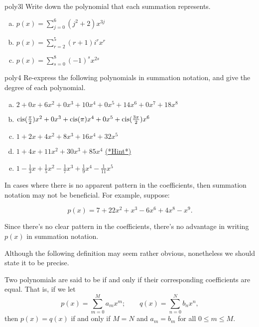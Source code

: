 \begin{exercise}{poly3l}
Write down the polynomial that each summation represents.
\begin{enumerate}[(a)]
\item
$p(x)  = \sum_{j=0}^{6}( j^2+2)x^{3j}$
\item
$p(x)  = \sum_{r=2}^{5} (r+1)i^rx^r$
\item
$p(x)  = \sum_{s=0}^{8} (-1)^sx^{2s}$
\end{enumerate}
\end{exercise}

\begin{exercise}{poly4}
Re-express the following polynomials in summation notation,  and give the degree of each polynomial.
\begin{enumerate}[(a)]
\item
$2 + 0x + 6x^2 + 0x^3 + 10x^4 + 0x^5 + 14x^6 +0x^7 +  18x^8$
\item
$\operatorname{cis}(\frac{\pi}{2})x^2 + 0x^3 + \operatorname{cis}(\pi)x^4 + 0x^5  + \operatorname{cis}(\frac{3\pi}{2})x^6$
\item
$1+ 2x + 4x^2 + 8x^3 + 16x^4 + 32x^5$
\item
$1+4x+11x^2+30x^3+85x^4$
\hyperref[sec:polyrings:hints]{(*Hint*)} 
\item
$1-\frac{1}{3}x + \frac{1}{5}x^2 - \frac{1}{7}x^3 + \frac{1}{9}x^4 - \frac{1}{11}x^5$
\end{enumerate}
\end{exercise}

\begin{rem}
In cases where there is no apparent pattern in the coefficients, then summation notation may not be beneficial. For example, suppose:


$$p(x) = 7+ 22x^2 + x^3-6x^6+4x^8-x^9.$$


Since there's no clear pattern in the coefficients, there's no advantage in writing $p(x)$ in summation notation.
\end{rem}
Although the following definition may seem rather obvious, nonetheless we should state it to be precise.

\begin{defn} Two polynomials are said to be   if and only if their corresponding coefficients are equal. That is, if we let    
$$
p(x)  = \sum^{M}_{m=0} a_m x^m; \qquad
q(x)  = \sum^{N}_{n=0} b_n x^n,
$$
then $p(x) = q(x)$ if and only if $M=N$ and $a_m = b_m$ for all $0 \leq m \leq M$.
\end {defn}

